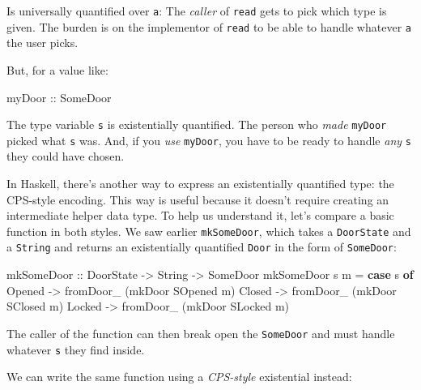 \documentclass[]{article}
\newenvironment{Shaded}{}{}
\newcommand{\DataTypeTok}[1]{\textcolor[rgb]{0.56,0.13,0.00}{#1}}
\newcommand{\KeywordTok}[1]{\textcolor[rgb]{0.00,0.44,0.13}{\textbf{#1}}}
\newcommand{\NormalTok}[1]{#1}
\newcommand{\OtherTok}[1]{\textcolor[rgb]{0.00,0.44,0.13}{#1}}
\begin{document}
Is universally quantified over \texttt{a}: The \emph{caller} of \texttt{read}
gets to pick which type is given. The burden is on the implementor of
\texttt{read} to be able to handle whatever \texttt{a} the user picks.

But, for a value like:

\begin{Shaded}
\begin{Highlighting}[]
\OtherTok{myDoor ::} \DataTypeTok{SomeDoor}
\end{Highlighting}
\end{Shaded}

The type variable \texttt{s} is existentially quantified. The person who
\emph{made} \texttt{myDoor} picked what \texttt{s} was. And, if you \emph{use}
\texttt{myDoor}, you have to be ready to handle \emph{any} \texttt{s} they could
have chosen.

In Haskell, there's another way to express an existentially quantified type: the
CPS-style encoding. This way is useful because it doesn't require creating an
intermediate helper data type. To help us understand it, let's compare a basic
function in both styles. We saw earlier \texttt{mkSomeDoor}, which takes a
\texttt{DoorState} and a \texttt{String} and returns an existentially quantified
\texttt{Door} in the form of \texttt{SomeDoor}:

\begin{Shaded}
\begin{Highlighting}[]
\NormalTok{mkSomeDoor}
\OtherTok{    ::} \DataTypeTok{DoorState}
    \OtherTok{->} \DataTypeTok{String}
    \OtherTok{->} \DataTypeTok{SomeDoor}
\NormalTok{mkSomeDoor s m }\OtherTok{=} \KeywordTok{case}\NormalTok{ s }\KeywordTok{of}
    \DataTypeTok{Opened} \OtherTok{->}\NormalTok{ fromDoor_ (mkDoor }\DataTypeTok{SOpened}\NormalTok{ m)}
    \DataTypeTok{Closed} \OtherTok{->}\NormalTok{ fromDoor_ (mkDoor }\DataTypeTok{SClosed}\NormalTok{ m)}
    \DataTypeTok{Locked} \OtherTok{->}\NormalTok{ fromDoor_ (mkDoor }\DataTypeTok{SLocked}\NormalTok{ m)}
\end{Highlighting}
\end{Shaded}

The caller of the function can then break open the \texttt{SomeDoor} and must
handle whatever \texttt{s} they find inside.

We can write the same function using a \emph{CPS-style} existential instead:
\end{document}
